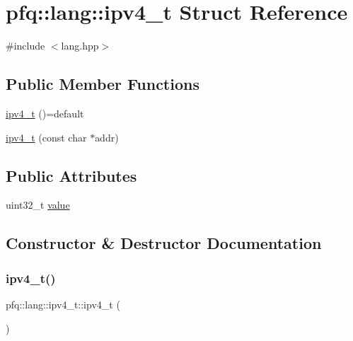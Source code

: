\hypertarget{structpfq_1_1lang_1_1ipv4__t}{}\section{pfq\+:\+:lang\+:\+:ipv4\+\_\+t Struct Reference}
\label{structpfq_1_1lang_1_1ipv4__t}


{\ttfamily \#include $<$lang.\+hpp$>$}

\subsection*{Public Member Functions}
\begin{DoxyCompactItemize}
\item 
\hyperlink{structpfq_1_1lang_1_1ipv4__t_a3237166f3fab90a77846d9656b0482c8}{ipv4\+\_\+t} ()=default
\item 
\hyperlink{structpfq_1_1lang_1_1ipv4__t_a86fa55f6ef31157415d65d43ce228fae}{ipv4\+\_\+t} (const char $\ast$addr)
\end{DoxyCompactItemize}
\subsection*{Public Attributes}
\begin{DoxyCompactItemize}
\item 
uint32\+\_\+t \hyperlink{structpfq_1_1lang_1_1ipv4__t_a5080d5f65781ad95e605d066f1693502}{value}
\end{DoxyCompactItemize}


\subsection{Constructor \& Destructor Documentation}
\mbox{\label{structpfq_1_1lang_1_1ipv4__t_a3237166f3fab90a77846d9656b0482c8}} 
\subsubsection{\texorpdfstring{ipv4\+\_\+t()}{ipv4\_t()}\hspace{0.1cm}{\footnotesize\ttfamily [1/2]}}
{\footnotesize\ttfamily pfq\+::lang\+::ipv4\+\_\+t\+::ipv4\+\_\+t (\begin{DoxyParamCaption}{ }\end{DoxyParamCaption})\hspace{0.3cm}{\ttfamily [default]}}

